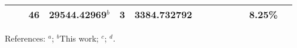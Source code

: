 \begin{table*}
\begin{center}
{\begin{tabular}{:l;l;c;l;c;l;c;l;l;c;c;c;c}
\rowstyle{\itshape}               &        & 46        & 29544.42969$^{b}$                & 3 &   3384.732792      &      & $                                        $ & $                                        $ &             &              & 8.25\%    & $     ^{}     $\\
\hline
\end{tabular}
}
{\footnotesize References:
$^{a}$\citet{Ruffoni:2010:424};
$^{b}$This work;
$^{c}$\citet{Aldenius:2009:014008};
$^{d}$\citet{Nave:2012:1570}.}
\end{center}
\end{table*}
